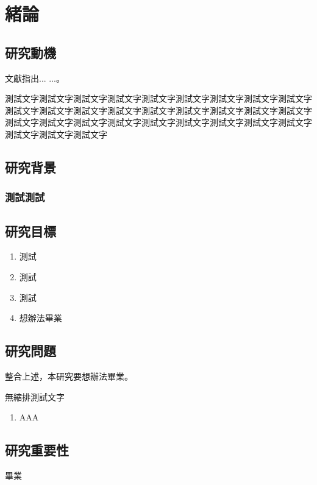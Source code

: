 \chapter{緒論}
\label{c:intro}
\section{研究動機}

文獻\cite{test2021}指出... ...。

測試文字測試文字測試文字測試文字測試文字測試文字測試文字測試文字測試文字測試文字測試文字測試文字測試文字測試文字測試文字測試文字測試文字測試文字測試文字測試文字測試文字測試文字測試文字測試文字測試文字測試文字測試文字測試文字測試文字測試文字

\section{研究背景}
\subsection{測試測試}

\section{研究目標}
\begin{enumerate}
\item 測試 
\item 測試 
\item 測試
\item 想辦法畢業
\end{enumerate}
\section{研究問題}
整合上述，本研究要想辦法畢業。

\noindent
無縮排測試文字
\begin{enumerate}
\label{q1}
\item AAA
\end{enumerate}

\section{研究重要性} 
畢業
